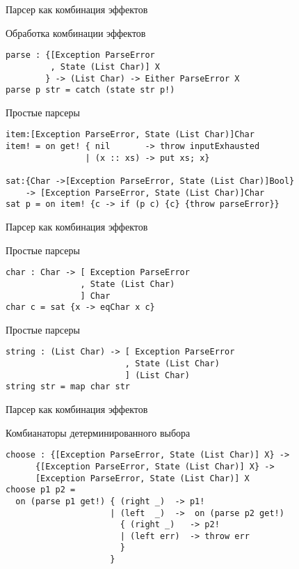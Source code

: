 \begin{frame}[fragile]{Парсер как комбинация эффектов}

\begin{block}{Обработка комбинации эффектов}
\begin{verbatim}
parse : {[Exception ParseError
         , State (List Char)] X
        } -> (List Char) -> Either ParseError X
parse p str = catch (state str p!)
\end{verbatim}
\end{block}

\begin{block}{Простые парсеры}
\begin{verbatim}
item:[Exception ParseError, State (List Char)]Char
item! = on get! { nil       -> throw inputExhausted
                | (x :: xs) -> put xs; x}

sat:{Char ->[Exception ParseError, State (List Char)]Bool}
    -> [Exception ParseError, State (List Char)]Char
sat p = on item! {c -> if (p c) {c} {throw parseError}}
\end{verbatim}
\end{block}
\end{frame}

\begin{frame}[fragile]{Парсер как комбинация эффектов}
\begin{block}{Простые парсеры}
\begin{verbatim}
char : Char -> [ Exception ParseError
               , State (List Char)
               ] Char
char c = sat {x -> eqChar x c}
\end{verbatim}
\end{block}

\begin{block}{Простые парсеры}
\begin{verbatim}
string : (List Char) -> [ Exception ParseError
                        , State (List Char)
                        ] (List Char)
string str = map char str
\end{verbatim}
\end{block}
\end{frame}

\begin{frame}[fragile]{Парсер как комбинация эффектов}
\begin{block}{Комбианаторы детерминированного выбора}
\begin{verbatim}
choose : {[Exception ParseError, State (List Char)] X} ->
      {[Exception ParseError, State (List Char)] X} ->
      [Exception ParseError, State (List Char)] X
choose p1 p2 =
  on (parse p1 get!) { (right _)  -> p1!
                     | (left  _)  ->  on (parse p2 get!)
                       { (right _)   -> p2!
                       | (left err)  -> throw err
                       }
                     }
\end{verbatim}
\end{block}
\end{frame}

